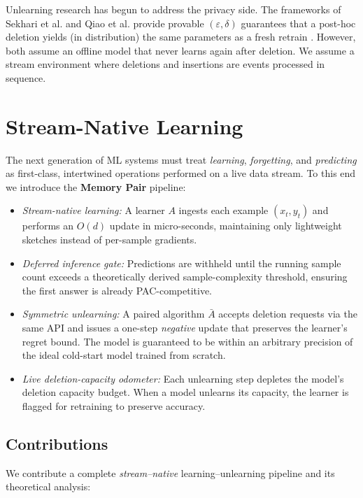 \documentclass[a4paper,12pt]{article}
\begin{document}
Unlearning research has begun to address the privacy side.  The frameworks of Sekhari et al. and Qiao et al. provide provable $(\varepsilon,\delta)$ guarantees that a post-hoc deletion yields (in distribution) the same parameters as a fresh retrain \cite{Sekhari_Acharya_Kamath_Suresh_2021-03}.  However, both assume an offline model that never learns again after deletion. We assume a stream environment where deletions and insertions are events processed in sequence.

\section{Stream-Native Learning}
\label{sec:stream-native}

The next generation of ML systems must treat \textit{learning}, \textit{forgetting}, and \textit{predicting} as first-class, intertwined operations performed on a live data stream.  To this end we introduce the \textbf{Memory Pair} pipeline:

\begin{itemize}
    \item \textit{Stream-native learning:} A learner $A$ ingests each example $(x_{t},y_{t})$ and performs an $O(d)$ update in micro-seconds, maintaining only lightweight sketches instead of per-sample gradients.
    \item \textit{Deferred inference gate:} Predictions are withheld until the running sample count exceeds a theoretically derived sample-complexity threshold, ensuring the first answer is already PAC-competitive.
    \item \textit{Symmetric unlearning:} A paired algorithm $\bar{A}$ accepts deletion requests via the same API and issues a one-step \textit{negative} update that preserves the learner’s regret bound. The model is guaranteed to be within an arbitrary precision of the ideal cold-start model trained from scratch.
    \item \textit{Live deletion-capacity odometer:} Each unlearning step depletes the model's deletion capacity budget. When a model unlearns its capacity, the learner is flagged for retraining to preserve accuracy.
\end{itemize}

\subsection{Contributions}
\label{subsec:contributions}

We contribute a complete \emph{stream–native} learning–unlearning pipeline and its theoretical analysis:
\end{document}
